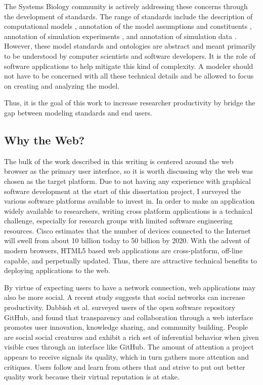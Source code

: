 The Systems Biology community is actively addressing these concerns through the development of standards.
The range of standards include the description of computational models \autocite{hucka:2002d, LloydCellML2004}, annotation of the model assumptions and constituents \autocite{novere2005minimum}, annotation of simulation experiments \autocite{kohn2008sed}, and annotation of simulation data \autocite{dada2010sbrml}.
However, these model standards and ontologies are abstract and meant primarily to be understood by computer scientists and software developers.
It is the role of software applications to help mitigate this kind of complexity.
A modeler should not have to be concerned with all these technical details and be allowed to focus on creating and analyzing the model.

Thus, it is the goal of this work to increase researcher productivity by bridge the gap between modeling standards and end users.

\subsection{Why the Web?}

The bulk of the work described in this writing is centered around the web browser as the primary user interface, so it is worth discussing why the web was chosen as the target platform.
Due to not having any experience with graphical software development at the start of this dissertation project, I surveyed the various software platforms available to invest in.
In order to make an application widely available to researchers, writing cross platform applications is a technical challenge, especially for research groups with limited software engineering resources. \autocite{cusumano1999netscape}
Cisco estimates that the number of devices connected to the Internet will swell from about 10 billion today to 50 billion by 2020. \autocite{clark2014internet}
With the advent of modern browsers, HTML5 based web applications are cross-platform, off-line capable, and perpetually updated. \autocite{o2007web}
Thus, there are attractive technical benefits to deploying applications to the web.

By virtue of expecting users to have a network connection, web applications may also be more social.
A recent study \autocite{dabbish2012social} suggests that social networks can increase productivity.
Dabbish et al. surveyed users of the open software repository GitHub, and found that transparency and collaboration through a web interface promotes user innovation, knowledge sharing, and community building.
People are social social creatures and exhibit a rich set of inferential behavior when given visible cues through an interface like GitHub.
The amount of attention a project appears to receive signals its quality, which in turn gathers more attention and critiques.
Users follow and learn from others that and strive to put out better quality work because their virtual reputation is at stake.

